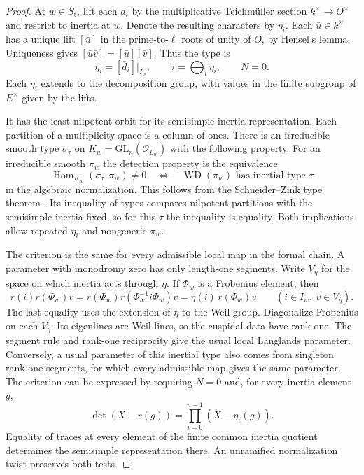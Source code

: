 \begin{proof}
At \(w\in S_{\mathrm t}\), lift each \(\bar d_i\) by the
multiplicative Teichmüller section \(k^\times\to O^\times\) and
restrict to inertia at \(w\). Denote the resulting characters by
\(\eta_i\). Each \(\bar u\in k^\times\) has a unique lift \([\bar u]\)
in the prime-to-\(\ell\) roots of unity of \(O\), by Hensel's lemma.
Uniqueness gives \([\bar u\bar v]=[\bar u][\bar v]\). Thus the type is
\[
  \eta_i=[\bar d_i]|_{I_w},\qquad
  \tau=\bigoplus_i\eta_i,\qquad N=0 .
\]
Each \(\eta_i\) extends to the decomposition group, with values
in the finite subgroup of \(E^\times\) given by the lifts.

It has the least
nilpotent orbit for its semisimple inertia representation. Each
partition of a multiplicity space is a column of ones. There is
an irreducible smooth type \(\sigma_\tau\) on
\(K_w=\mathrm{GL}_n(\mathcal O_{L_w})\) with the following property.
For an irreducible smooth \(\pi_w\) the detection property is the equivalence
\[
 \operatorname{Hom}_{K_w}(\sigma_\tau,\pi_w)\ne0\quad\Longleftrightarrow\quad \operatorname{WD}(\pi_w)\text{ has inertial type }\tau
\]
in the algebraic normalization. This follows from the
Schneider--Zink type theorem \cite[Theorem 3.7(1)--(2)]{shotton-types}.
Its inequality of types compares nilpotent partitions with the
semisimple inertia fixed, so for this \(\tau\) the inequality is
equality. Both implications allow repeated \(\eta_i\) and
nongeneric \(\pi_w\).

The criterion is the same for every admissible local map in the
formal chain. A parameter with monodromy zero has only length-one
segments. Write \(V_\eta\) for the space on which inertia acts through
\(\eta\). If \(\Phi_w\) is a Frobenius element, then
\[
 r(i)r(\Phi_w)v
  =r(\Phi_w)r(\Phi_w^{-1}i\Phi_w)v
  =\eta(i)\,r(\Phi_w)v
       \qquad(i\in I_w,\ v\in V_\eta).
\]
The last equality uses the extension of \(\eta\) to the Weil
group. Diagonalize Frobenius on each \(V_\eta\). Its eigenlines
are Weil lines, so the cuspidal data have rank one. The segment
rule and rank-one reciprocity give the usual local Langlands
parameter. Conversely, a usual parameter of
this inertial type also comes from singleton rank-one segments,
for which every admissible map gives the same parameter. The
criterion can be expressed by requiring \(N=0\) and, for every
inertia element \(g\),
\[
   \det(X-r(g))=\prod_{i=0}^{n-1}(X-\eta_i(g)).
\]
Equality of traces at every element of the finite common inertia
quotient determines the semisimple representation there.
An unramified normalization twist preserves both tests.


\end{proof}
